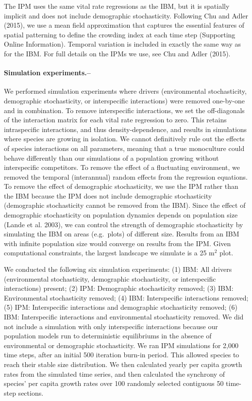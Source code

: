 \documentclass[12pt,]{article}
\begin{document}
The IPM uses the same vital rate regressions as the IBM, but it is
spatially implicit and does not include demographic stochasticity.
Following Chu and Adler (2015), we use a mean field approximation that
captures the essential features of spatial patterning to define the
crowding index at each time step (Supporting Online Information).
Temporal variation is included in exactly the same way as for the IBM.
For full details on the IPMs we use, see Chu and Adler (2015).

\paragraph{Simulation experiments.--}\label{simulation-experiments.}

We performed simulation experiments where drivers (environmental
stochasticity, demographic stochasticity, or interspecific interactions)
were removed one-by-one and in combination. To remove interspecific
interactions, we set the off-diagonals of the interaction matrix for
each vital rate regression to zero. This retains intraspecific
interactions, and thus density-dependence, and results in simulations
where species are growing in isolation. We cannot definitively rule out
the effects of species interactions on all parameters, meaning that a
true monoculture could behave differently than our simulations of a
population growing without interspecific competitors. To remove the
effect of a fluctuating environment, we removed the temporal
(interannual) random effects from the regression equations. To remove
the effect of demographic stochasticity, we use the IPM rather than the
IBM because the IPM does not include demographic stochasticity
(demographic stochasticity cannot be removed from the IBM). Since the
effect of demographic stochasticity on population dynamics depends on
population size (Lande et al. 2003), we can control the strength of
demographic stochasticity by simulating the IBM on areas (e.g.~plots) of
different size. Results from an IBM with infinite population size would
converge on results from the IPM. Given computational constraints, the
largest landscape we simulate is a 25 \(\text{m}^2\) plot.

We conducted the following six simulation experiments: (1) IBM: All
drivers (environmental stochasticity, demographic stochasticity, or
interspecific interactions) present; (2) IPM: Demographic stochasticity
removed; (3) IBM: Environmental stochasticity removed; (4) IBM:
Interspecific interactions removed; (5) IPM: Interspecific interactions
and demographic stochasticity removed; (6) IBM: Interspecific
interactions and environmental stochasticity removed.
We did not include a simulation with only interspecific interactions because our population models run to deterministic equilibriums in the absence of environmental or demographic stochasticity.
We ran IPM simulations for 2,000 time steps, after an initial 500
iteration burn-in period. This allowed species to reach their stable
size distribution. We then calculated yearly per capita growth rates
from the simulated time series, and then calculated the synchrony of
species' per capita growth rates over 100 randomly selected contiguous
50 time-step sections.
\end{document}
